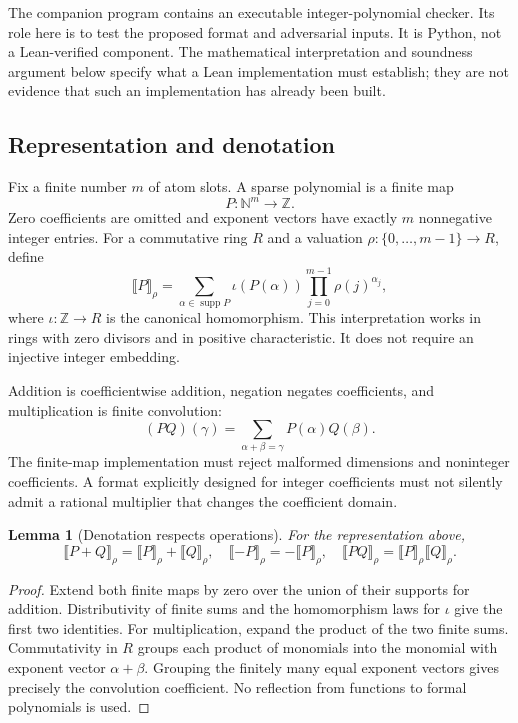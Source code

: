 \documentclass[11pt,a4paper]{article}
\newcommand{\N}{\mathbb N}\newcommand{\Z}{\mathbb Z}
\newcommand{\den}[1]{\llbracket #1\rrbracket}
\theoremstyle{plain}\newtheorem{proposition}{Proposition}[section]
\newtheorem{lemma}[proposition]{Lemma}
\theoremstyle{definition}\newtheorem{definition}[proposition]{Definition}
\theoremstyle{remark}\newtheorem{remark}[proposition]{Remark}
\begin{document}
The companion program contains an executable integer-polynomial checker. Its role here is to test the proposed format and adversarial inputs. It is Python, not a Lean-verified component. The mathematical interpretation and soundness argument below specify what a Lean implementation must establish; they are not evidence that such an implementation has already been built.

\subsection{Representation and denotation}
Fix a finite number \(m\) of atom slots. A sparse polynomial is a finite map
\[
 P:\N^m\longrightarrow\Z.
\]
Zero coefficients are omitted and exponent vectors have exactly \(m\) nonnegative integer entries. For a commutative ring \(R\) and a valuation \(\rho:\{0,\ldots,m-1\}\to R\), define
\[
 \den{P}_{\rho}
 =\sum_{\alpha\in\operatorname{supp}P}
   \iota(P(\alpha))\prod_{j=0}^{m-1}\rho(j)^{\alpha_j},
\]
where \(\iota:\Z\to R\) is the canonical homomorphism. This interpretation works in rings with zero divisors and in positive characteristic. It does not require an injective integer embedding.

Addition is coefficientwise addition, negation negates coefficients, and multiplication is finite convolution:
\[
 (P Q)(\gamma)=\sum_{\alpha+\beta=\gamma}P(\alpha)Q(\beta).
\]
The finite-map implementation must reject malformed dimensions and noninteger coefficients. A format explicitly designed for integer coefficients must not silently admit a rational multiplier that changes the coefficient domain.

\begin{lemma}[Denotation respects operations]\label{lem:denotation}
For the representation above,
\[
 \den{P+Q}_{\rho}=\den P_{\rho}+\den Q_{\rho},\quad
 \den{-P}_{\rho}=-\den P_{\rho},\quad
 \den{P Q}_{\rho}=\den P_{\rho}\den Q_{\rho}.
\]
\end{lemma}
\begin{proof}
Extend both finite maps by zero over the union of their supports for addition. Distributivity of finite sums and the homomorphism laws for \(\iota\) give the first two identities. For multiplication, expand the product of the two finite sums. Commutativity in \(R\) groups each product of monomials into the monomial with exponent vector \(\alpha+\beta\). Grouping the finitely many equal exponent vectors gives precisely the convolution coefficient. No reflection from functions to formal polynomials is used.
\end{proof}
\end{document}
